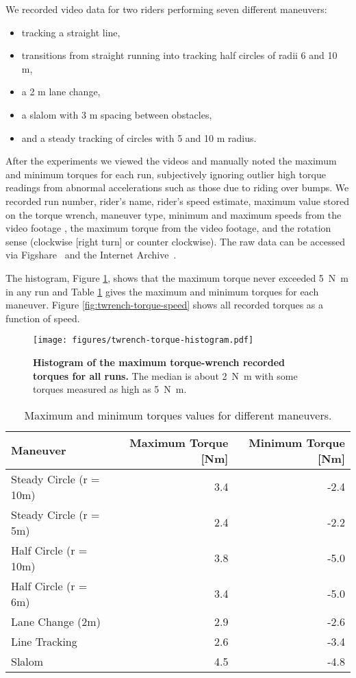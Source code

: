 \documentclass[10pt]{article}
\begin{document}
We recorded video data for two riders performing seven different maneuvers:

\begin{itemize}
  \item tracking a straight line,
  \item transitions from straight running into tracking half circles of radii 6 and 10
    m,
  \item a 2 m lane change,
  \item a slalom with 3 m spacing between obstacles,
  \item and a steady tracking of circles with 5 and 10 m radius.
\end{itemize}

After the experiments we viewed the videos and manually noted the maximum and
minimum torques for each run, subjectively ignoring outlier high torque
readings from abnormal accelerations such as those due to riding over bumps. We
recorded run number, rider's name, rider's speed estimate, maximum value stored
on the torque wrench, maneuver type, minimum and maximum speeds from the video
footage , the maximum torque from the video footage, and the rotation sense
(clockwise [right turn] or counter clockwise). The raw data can be accessed via
Figshare~\cite{} and the Internet Archive~\cite{}.

The histogram, Figure \ref{fig:twrench-torque-histogram}, shows that the
maximum torque never exceeded \SI{5}{\newton\meter} in any run and Table
\ref{tab:maneuver-torque-values} gives the maximum and minimum torques for each
maneuver. Figure \ref{fig:twrench-torque-speed} shows all recorded torques as a
function of speed.

\begin{figure}
  \centering
  \texttt{[image: figures/twrench-torque-histogram.pdf]}
  \caption{{\bf Histogram of the maximum torque-wrench recorded torques for all runs.}
    The median is about \SI{2}{\newton\meter} with some torques measured as high as \SI{5}{\newton\meter}. }
  \label{fig:twrench-torque-histogram}
\end{figure}

\begin{table}
  \caption{Maximum and minimum torques values for different maneuvers.}
  \begin{tabular}{lrr}
    \toprule
    Maneuver & Maximum Torque [Nm] & Minimum Torque [Nm] \\
    \midrule
    Steady Circle (r = 10m) & 3.4 & -2.4 \\
    Steady Circle (r = 5m) & 2.4 & -2.2 \\
    Half Circle (r = 10m) & 3.8 & -5.0 \\
    Half Circle (r = 6m) & 3.4 & -5.0 \\
    Lane Change (2m) & 2.9 & -2.6 \\
    Line Tracking & 2.6 & -3.4 \\
    Slalom & 4.5 & -4.8 \\
    \bottomrule
  \end{tabular}
  \label{tab:maneuver-torque-values}
\end{table}
\end{document}
